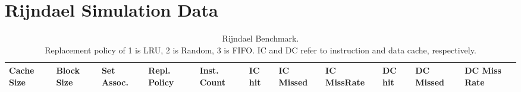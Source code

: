 \documentclass[conference]{IEEEtran}
\begin{document}
  \section{Rijndael Simulation Data}
  \begin{table}
    \caption{Rijndael Benchmark. \\ Replacement policy of 1 is LRU, 2 is Random, 3 is FIFO. IC and DC refer to instruction and data cache, respectively.}
    \centering
      \begin{tabular}{|m{.75cm} |m{.75cm} |m{.8cm} | m{.75cm} | l | l | l | l | l | l | l |}
        \hline
        \textbf{Cache Size} & \textbf{ Block Size} & \textbf{Set Assoc.} & \textbf{Repl. Policy} & \textbf{Inst. Count} & \textbf{IC hit} & \textbf{IC Missed} & \textbf{IC MissRate} & \textbf{DC hit} & \textbf{DC Missed} & \textbf{DC Miss Rate} \\ \hline
                            

\end{tabular}
\end{table}
\end{document}
